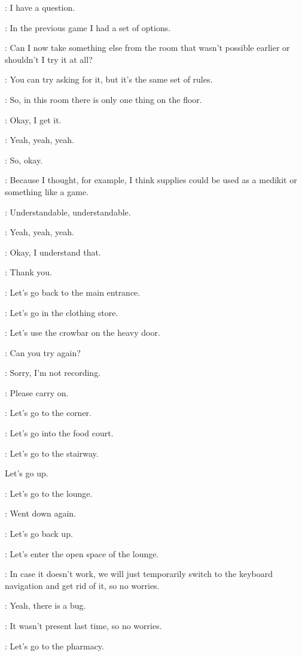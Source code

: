 \Kacper: I have a question.

\Kacper: In the previous game I had a set of options.

\Kacper: Can I now take something else from the room that wasn't possible earlier or shouldn't I try it at all?

\Gabriel: You can try asking for it, but it's the same set of rules.

\Gabriel: So, in this room there is only one thing on the floor.

\Gabriel: Okay, I get it.

\Gabriel: Yeah, yeah, yeah.

\Kacper: So, okay.

\Kacper: Because I thought, for example, I think supplies could be used as a medikit or something like a game.

\Kacper: Understandable, understandable.

\Kacper: Yeah, yeah, yeah.

\Kacper: Okay, I understand that.

\Kacper: Thank you.

\Kacper: Let's go back to the main entrance.

\Kacper: Let's go in the clothing store.

\Kacper: Let's use the crowbar on the heavy door.

\Gabriel: Can you try again?

\Gabriel: Sorry, I'm not recording.

\Gabriel: Please carry on.

\Kacper: Let's go to the corner.

\Kacper: Let's go into the food court.

\Kacper: Let's go to the stairway.

Let's go up.

\Kacper: Let's go to the lounge.

\Kacper: Went down again.

\Kacper: Let's go back up.

\Kacper: Let's enter the open space of the lounge.

\Gabriel: In case it doesn't work, we will just temporarily switch to the keyboard navigation and get rid of it, so no worries.

\Gabriel: Yeah, there is a bug.

\Gabriel: It wasn't present last time, so no worries.

\Gabriel: Let's go to the pharmacy.

